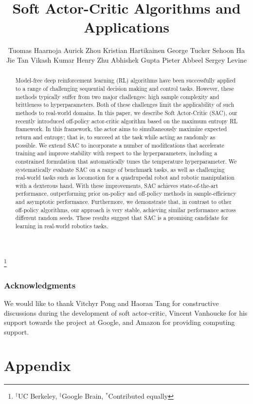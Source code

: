 \documentclass{article}
\title{Soft Actor-Critic Algorithms and Applications}
\author{
Tuomas Haarnoja\equal\ucb\brain
\And
Aurick Zhou\equal\ucb
\And
Kristian Hartikainen\equal\ucb
\And
George Tucker\brain
\And
Sehoon Ha\brain
\And
Jie Tan\brain
\And
Vikash Kumar\brain
\And
Henry Zhu\ucb
\And 
Abhishek Gupta\ucb
\And
Pieter Abbeel\ucb
\And
Sergey Levine\ucb\brain
}
\newcommand{\equal}{$^*$}
\newcommand{\ucb}{$^\dagger$}
\newcommand{\brain}{$^\ddagger$}
\begin{document}
%

\newcommand\blfootnote[1]{%
  \begingroup
  \renewcommand\thefootnote{}\footnote{#1}%
  \addtocounter{footnote}{-1}%
  \endgroup
}
\blfootnote{\ucb UC Berkeley, \brain Google Brain, \equal Contributed equally}

\maketitle

\begin{abstract}
Model-free deep reinforcement learning (RL) algorithms have been successfully applied to a range of challenging sequential decision making and control tasks. However, these methods typically suffer from two major challenges: high sample complexity and brittleness to hyperparameters. Both of these challenges limit the applicability of such methods to real-world domains. In this paper, we describe Soft Actor-Critic (SAC), our recently introduced off-policy actor-critic algorithm based on the maximum entropy RL framework. In this framework, the actor aims to simultaneously maximize expected return and entropy; that is, to succeed at the task while acting as randomly as possible. We extend SAC to incorporate a number of modifications that accelerate training and improve stability with respect to the hyperparameters, including a constrained formulation that automatically tunes the temperature hyperparameter. We systematically evaluate SAC on a range of benchmark tasks, as well as challenging real-world  tasks such as locomotion for a quadrupedal robot and robotic manipulation with a dexterous hand. With these improvements, SAC achieves state-of-the-art performance, outperforming prior on-policy and off-policy methods in sample-efficiency and asymptotic performance. Furthermore, we demonstrate that, in contrast to other off-policy algorithms, our approach is very stable, achieving similar performance across different random seeds. These results suggest that SAC is a promising candidate for learning in real-world robotics tasks.
\end{abstract}


\subsubsection*{Acknowledgments}
We would like to thank Vitchyr Pong and Haoran Tang for constructive discussions during the development of soft actor-critic, Vincent Vanhoucke for his support towards the project at Google, and Amazon for providing computing support.





\section*{Appendix}
\appendix

\end{document}
